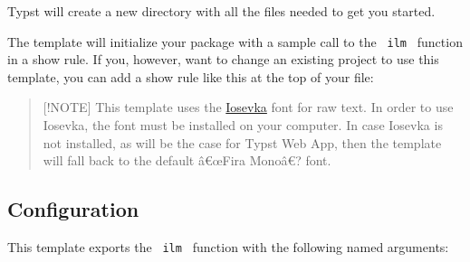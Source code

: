 Typst will create a new directory with all the files needed to get you
started.

The template will initialize your package with a sample call to the
\texttt{\ ilm\ } function in a show rule. If you, however, want to
change an existing project to use this template, you can add a show rule
like this at the top of your file:

\begin{Shaded}
\begin{Highlighting}[]


\NormalTok{)}

\end{Highlighting}
\end{Shaded}

\begin{quote}
{[}!NOTE{]} This template uses the
\href{https://typeof.net/Iosevka/}{Iosevka} font for raw text. In order
to use Iosevka, the font must be installed on your computer. In case
Iosevka is not installed, as will be the case for Typst Web App, then
the template will fall back to the default â€œFira Monoâ€? font.
\end{quote}

\subsection{Configuration}\label{configuration}

This template exports the \texttt{\ ilm\ } function with the following
named arguments:


